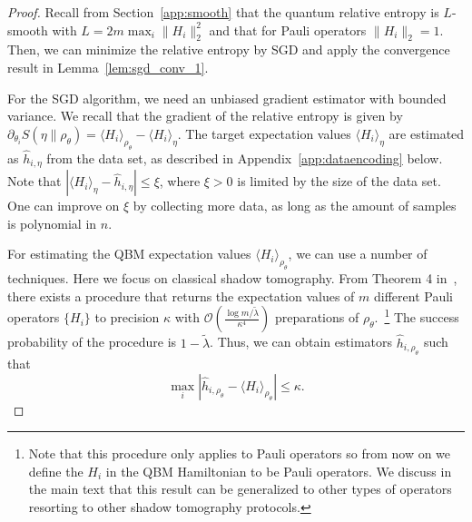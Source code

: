 \documentclass[
    aps,
    prx,
    onecolumn
]{revtex4-2}
\begin{document}
\begin{proof}
Recall from Section~\ref{app:smooth} that the quantum relative entropy is $L$-smooth with $L=2 m \max_i \| H_i \|_2^2$ and that for Pauli operators $\| H_i \|_2 = 1$. Then, we can minimize the relative entropy by SGD and apply the convergence result in Lemma~\ref{lem:sgd_conv_1}. 

For the SGD algorithm, we need an unbiased gradient estimator with bounded variance. We recall that the gradient of the relative entropy is given by $\partial_{\theta_i} S(\eta \|\rho_\theta)  = \langle H_i \rangle_{\rho_\theta} - \langle H_i\rangle_\eta$. The target expectation values $\langle H_i\rangle_\eta$ are estimated as $\hat{h}_{i,\eta}$ from the data set, as described in Appendix~\ref{app:dataencoding} below. Note that $| \langle H_i\rangle_\eta - \hat{h}_{i,\eta} | \leq \xi$, where $\xi >0$ is limited by the size of the data set. One can improve on $\xi$ by collecting more data, as long as the amount of samples is polynomial in $n$.

For estimating the QBM expectation values $\langle H_i \rangle_{\rho_\theta}$, we can use a number of techniques. Here we focus on classical shadow tomography. From Theorem 4 in~\cite{Huang_2021}, there exists a procedure that returns the expectation values of $m$ different Pauli operators $\{H_i\}$ to precision $\kappa$ with $\mathcal{O}(\frac{\log{m/\tilde{\lambda}}}{\kappa^4})$ preparations of $\rho_\theta$.~\footnote{Note that this procedure only applies to Pauli operators so from now on we define the $H_i$ in the QBM Hamiltonian to be Pauli operators. We discuss in the main text that this result can be generalized to other types of operators resorting to other shadow tomography protocols.} The success probability of the procedure is $1-\tilde{\lambda}$. Thus, we can obtain estimators $\hat{h}_{i, \rho_\theta}$ such that 
\begin{equation}
\label{eq:shadows}
    \max_i |\hat{h}_{i, \rho_\theta} - \langle H_i\rangle_{\rho_\theta}| \leq \kappa. 
\end{equation} 


\end{proof}
\end{document}
